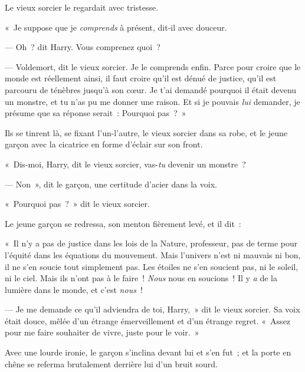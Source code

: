 Le vieux sorcier le regardait avec tristesse.

«~Je suppose que je \emph{comprends} à présent, dit-il avec douceur.

--- Oh~? dit Harry. Vous comprenez quoi~?

--- Voldemort, dit le vieux sorcier. Je le comprends enfin. Parce pour croire que le monde est réellement ainsi, il faut croire qu'il est dénué de justice, qu'il est parcouru de ténèbres jusqu'à son cœur. Je t'ai demandé pourquoi il était devenu un monstre, et tu n'as pu me donner une raison. Et si je pouvais \emph{lui} demander, je présume que sa réponse serait~: Pourquoi pas~?~»

\later

Ils se tinrent là, se fixant l'un-l'autre, le vieux sorcier dans sa robe, et le jeune garçon avec la cicatrice en forme d'éclair sur son front.

«~Dis-moi, Harry, dit le vieux sorcier, vas-\emph{tu} devenir un monstre~?

--- Non~», dit le garçon, une certitude d'acier dans la voix.

«~Pourquoi pas~?~» dit le vieux sorcier.

Le jeune garçon se redressa, son menton fièrement levé, et il dit~:

«~Il n'y a pas de justice dans les lois de la Nature, professeur, pas de terme pour l'équité dans les équations du mouvement. Mais l'univers n'est ni mauvais ni bon, il ne s'en soucie tout simplement pas. Les étoiles ne s'en soucient pas, ni le soleil, ni le ciel. Mais ils n'ont pas à le faire~! \emph{Nous} nous en soucions~! Il y \emph{a} de la lumière dans le monde, et c'est \emph{nous}~!

--- Je me demande ce qu'il adviendra de toi, Harry,~» dit le vieux sorcier. Sa voix était douce, mêlée d'un étrange émerveillement et d'un étrange regret. «~Assez pour me faire souhaiter de vivre, juste pour le voir.~»

Avec une lourde ironie, le garçon s'inclina devant lui et s'en fut~; et la porte en chêne se referma brutalement derrière lui d'un bruit sourd.
